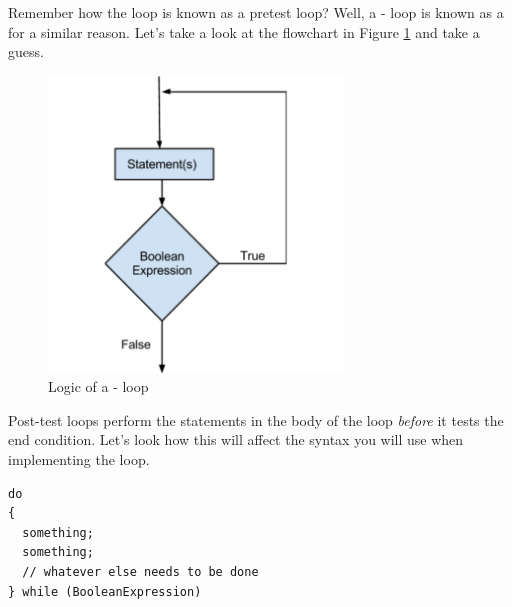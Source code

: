 \noindent{}

\noindent{}

\noindent{}

\noindent{}

\noindent{}

\noindent{}

\noindent{}

\noindent{}

\noindent{}


Remember how the  loop is known as a pretest loop?
Well, a - loop is known as a  for a similar reason.
Let's take a look at the flowchart in Figure \ref{fig-do-while-logic} and take a guess.

\begin{figure}[tbh]
  \centering
  \includegraphics[width=0.7\textwidth]{diagrams/do_while_logic.pdf}
  \caption{Logic of a - loop} \label{fig-do-while-logic} 
\end{figure}

Post-test loops perform the statements in the body of the loop \emph{before} it tests the end condition.
Let's look how this will affect the syntax you will use when implementing the loop.

\noindent\begin{minipage}{\linewidth}\begin{lstlisting}
do
{
  something;
  something;
  // whatever else needs to be done
} while (BooleanExpression)
\end{lstlisting}\end{minipage}

